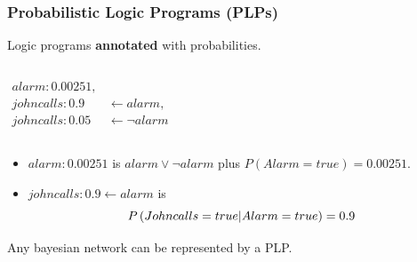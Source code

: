\documentclass[bigger]{beamer}
\begin{document}
\begin{frame}
    \frametitle{Probabilistic Logic Programs (PLPs)}
    \small

    \vfill
    \begin{center}
        Logic programs \textbf{annotated} with probabilities.
    \end{center}

    \vfill
    \begin{columns}[c]


        $
            \begin{aligned}
                alarm:0.00251, &                       \\
                johncalls:0.9  & \leftarrow alarm,     \\
                johncalls:0.05 & \leftarrow \neg alarm
            \end{aligned}
        $
    \end{columns}

    \vfill
    \begin{itemize}
        \item \alert{$alarm:0.00251$} is $alarm \vee \neg alarm$ plus $P(Alarm = true) = 0.00251$.
        \item \alert{$johncalls:0.9 \leftarrow alarm$} is
              $$P\del{Johncalls = true \middle| Alarm = true} = 0.9$$
    \end{itemize}

    \vfill
    \begin{center}
        Any bayesian network can be represented by a PLP.
    \end{center}
\end{frame}
%
\end{document}
